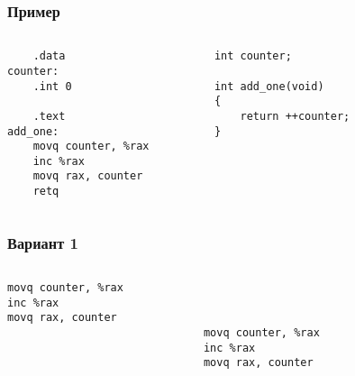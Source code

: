 \begin{frame}[fragile]
\frametitle{Пример}
    \begin{columns}
        \begin{column}{.4\textwidth}
            \begin{lstlisting}
    .data
counter:
    .int 0

    .text
add_one:
    movq counter, %rax
    inc %rax
    movq rax, counter
    retq
            \end{lstlisting}
        \end{column}
        \begin{column}{.4\textwidth}
            \begin{lstlisting}
int counter;

int add_one(void)
{
    return ++counter;
}	
            \end{lstlisting}
        \end{column}
        \begin{column}{.2\textwidth}
        \end{column}
    \end{columns}
\end{frame}

\begin{frame}[fragile]
\frametitle{Вариант 1}
\begin{columns}
    \begin{column}{.35\textwidth}
        \begin{lstlisting}
movq counter, %rax
inc %rax
movq rax, counter
 
 
 
        \end{lstlisting}
    \end{column}
    \begin{column}{.35\textwidth}
        \begin{lstlisting}
 
 
 
movq counter, %rax
inc %rax
movq rax, counter
        \end{lstlisting}
    \end{column}
    \begin{column}{.3\textwidth}
    \end{column}
\end{columns}
\end{frame}

